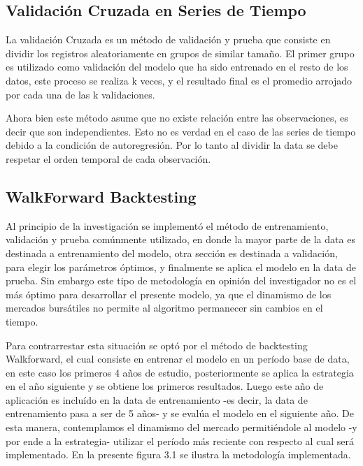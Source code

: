 \documentclass[a4paper,12pt]{Latex/Classes/PhDthesisPSnPDF}
\begin{document}
\subsection{Validación Cruzada en Series de Tiempo}

La validación Cruzada es un método de validación y prueba que consiste en dividir los registros aleatoriamente en grupos de similar tamaño. El primer grupo es utilizado como validación del modelo que ha sido entrenado en el resto de los datos, este proceso se realiza k veces, y el resultado final es el promedio arrojado por cada una de las k validaciones.

Ahora bien este método asume que no existe relación entre las observaciones, es decir que son independientes. Esto no es verdad en el caso de las series de tiempo debido a la condición de autoregresión. Por lo tanto al dividir la data se debe respetar el orden temporal de cada observación. 

\subsection{WalkForward Backtesting}

Al principio de la investigación se implementó el método de entrenamiento, validación y prueba comúnmente utilizado, en donde la mayor parte de la data es destinada a entrenamiento del modelo, otra sección es destinada a validación, para elegir los parámetros óptimos, y finalmente se aplica el modelo en la data de prueba. Sin embargo este tipo de metodología en opinión del investigador no es el más óptimo para desarrollar el presente modelo, ya que el dinamismo de los mercados bursátiles no permite al algoritmo permanecer sin cambios en el tiempo.

Para contrarrestar esta situación se optó por el método de backtesting Walkforward, el cual consiste en entrenar el modelo en un período base de data, en este caso los primeros 4 años de estudio, posteriormente se aplica la estrategia en el año siguiente y se obtiene los primeros resultados. Luego este año de aplicación es incluído en la data de entrenamiento -es decir, la data de entrenamiento pasa a ser de 5 años- y se evalúa el modelo en el siguiente año. De esta manera, contemplamos el dinamismo del mercado permitiéndole al modelo -y por ende a la estrategia- utilizar el período más reciente con respecto al cual será implementado. En la presente figura 3.1 se ilustra la metodología implementada.
\end{document}
